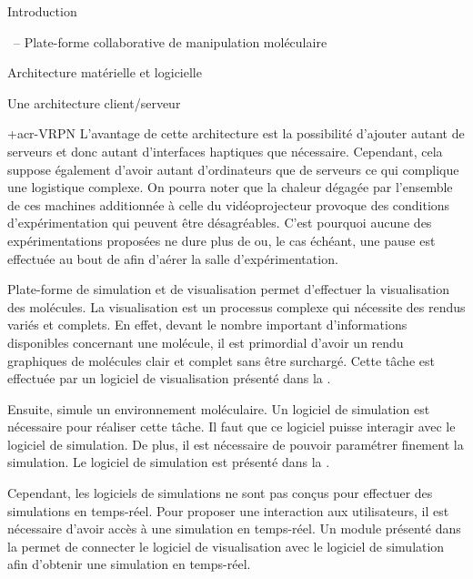 \documentclass[myfrancais]{mythesis}
\begin{document}
\begin{mypart}{Introduction}
\begin{mychapter}{\myShaddock\ -- Plate-forme collaborative de manipulation moléculaire}
\begin{mysection}{Architecture matérielle et logicielle}
\begin{mysubsection}{Une architecture client/serveur}
\begin{mysubsubsection}{\myacronl+{acr-VRPN}}
						L'avantage de cette architecture est la possibilité d'ajouter autant de serveurs et donc autant d'interfaces haptiques que nécessaire.
						Cependant, cela suppose également d'avoir autant d'ordinateurs que de serveurs ce qui complique une logistique complexe.
						On pourra noter que la chaleur dégagée par l'ensemble de ces machines additionnée à celle du vidéoprojecteur provoque des conditions d'expérimentation qui peuvent être désagréables.
						C'est pourquoi aucune des expérimentations proposées ne dure plus de  ou, le cas échéant, une pause est effectuée au bout de  afin d'aérer la salle d'expérimentation.
					\end{mysubsubsection}
				\end{mysubsection}
			\end{mysection}
			\begin{mysection}{Plate-forme de simulation et de visualisation}
				\myShaddock permet d'effectuer la visualisation des molécules.
				La visualisation est un processus complexe qui nécessite des rendus variés et complets.
				En effet, devant le nombre important d'informations disponibles concernant une molécule, il est primordial d'avoir un rendu graphiques de molécules clair et complet sans être surchargé.
				Cette tâche est effectuée par un logiciel de visualisation présenté dans la .

				Ensuite, \myShaddock simule un environnement moléculaire.
				Un logiciel de simulation est nécessaire pour réaliser cette tâche.
				Il faut que ce logiciel puisse interagir avec le logiciel de simulation.
				De plus, il est nécessaire de pouvoir paramétrer finement la simulation.
				Le logiciel de simulation est présenté dans la .

				Cependant, les logiciels de simulations ne sont pas conçus pour effectuer des simulations en temps-réel.
				Pour proposer une interaction aux utilisateurs, il est nécessaire d'avoir accès à une simulation en temps-réel.
				Un module présenté dans la  permet de connecter le logiciel de visualisation avec le logiciel de simulation afin d'obtenir une simulation en temps-réel.


\end{mysection}
\end{mychapter}
\end{mypart}
\end{document}
